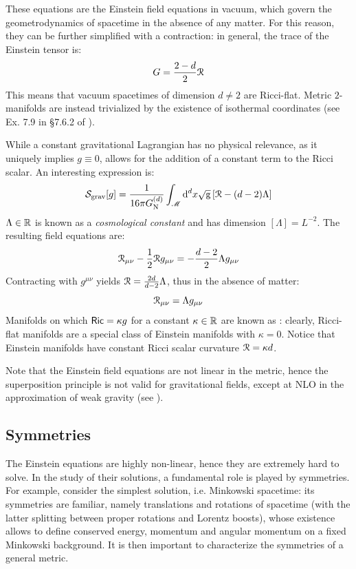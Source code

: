 These equations are the Einstein field equations in vacuum, which govern the geometrodynamics of spacetime in the absence of any matter. For this reason, they can be further simplified with a contraction: in general, the trace of the Einstein tensor is:
\begin{equation}
  G = \frac{2 - d}{2} \EuScript{R}
\end{equation}
This means that vacuum spacetimes of dimension $ d \neq 2 $ are Ricci-flat. Metric $ 2 $-manifolds are instead trivialized by the existence of isothermal coordinates (see Ex. 7.9 in \S 7.6.2 of \cite{nakahara}).

While a constant gravitational Lagrangian has no physical relevance, as it uniquely implies $ g \equiv 0 $,  allows for the addition of a constant term to the Ricci scalar. An interesting expression is:
\begin{equation}
  \mathcal{S}_\text{grav}[g] = \frac{1}{16 \pi G_\text{N}^{(d)}} \int_\mathscr{M} \mathrm{d}^d x \sqrt{\mathrm{g}} \left[ \EuScript{R} - (d - 2) \Lambda \right]
\end{equation}
$ \Lambda \in \mathbb{R} $ is known as a \emph{cosmological constant} and has dimension $ [\Lambda] = L^{-2} $. The resulting field equations are:
\begin{equation}
  \EuScript{R}_{\mu \nu} - \frac{1}{2} \EuScript{R} g_{\mu \nu} = - \frac{d-2}{2} \Lambda g_{\mu \nu}
\end{equation}
Contracting with $ g^{\mu \nu} $ yields $ \EuScript{R} = \frac{2d}{d-2} \Lambda $, thus in the absence of matter:
\begin{equation}
  \EuScript{R}_{\mu \nu} = \Lambda g_{\mu \nu}
\end{equation}
Manifolds on which $ \textsf{Ric} = \kappa g $ for a constant $ \kappa \in \mathbb{R} $ are known as : clearly, Ricci-flat manifolds are a special class of Einstein manifolds with $ \kappa = 0 $. Notice that Einstein manifolds have constant Ricci scalar curvature $ \EuScript{R} = \kappa d $.

Note that the Einstein field equations are not linear in the metric, hence the superposition principle is not valid for gravitational fields, except at NLO in the approximation of weak gravity (see ).

\subsection{Symmetries}

The Einstein equations are highly non-linear, hence they are extremely hard to solve. In the study of their solutions, a fundamental role is played by symmetries. For example, consider the simplest solution, i.e. Minkowski spacetime: its symmetries are familiar, namely translations and rotations of spacetime (with the latter splitting between proper rotations and Lorentz boosts), whose existence allows to define conserved energy, momentum and angular momentum on a fixed Minkowski background. It is then important to characterize the symmetries of a general metric.

